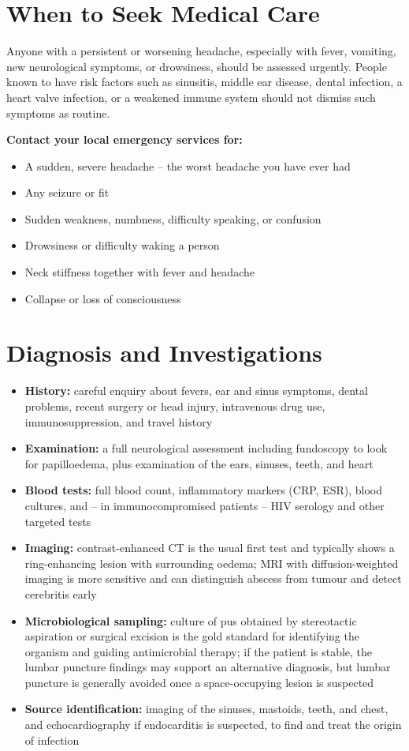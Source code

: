 \section*{When to Seek Medical Care}
Anyone with a persistent or worsening headache, especially with fever, vomiting, new neurological symptoms, or drowsiness, should be assessed urgently. People known to have risk factors such as sinusitis, middle ear disease, dental infection, a heart valve infection, or a weakened immune system should not dismiss such symptoms as routine.

\textbf{Contact your local emergency services for:}
\begin{itemize}
    \item A sudden, severe headache -- the worst headache you have ever had
    \item Any seizure or fit
    \item Sudden weakness, numbness, difficulty speaking, or confusion
    \item Drowsiness or difficulty waking a person
    \item Neck stiffness together with fever and headache
    \item Collapse or loss of consciousness
\end{itemize}

\section*{Diagnosis and Investigations}
\begin{itemize}
    \item \textbf{History:} careful enquiry about fevers, ear and sinus symptoms, dental problems, recent surgery or head injury, intravenous drug use, immunosuppression, and travel history
    \item \textbf{Examination:} a full neurological assessment including fundoscopy to look for papilloedema, plus examination of the ears, sinuses, teeth, and heart
    \item \textbf{Blood tests:} full blood count, inflammatory markers (CRP, ESR), blood cultures, and -- in immunocompromised patients -- HIV serology and other targeted tests
    \item \textbf{Imaging:} contrast-enhanced CT is the usual first test and typically shows a ring-enhancing lesion with surrounding oedema; MRI with diffusion-weighted imaging is more sensitive and can distinguish abscess from tumour and detect cerebritis early
    \item \textbf{Microbiological sampling:} culture of pus obtained by stereotactic aspiration or surgical excision is the gold standard for identifying the organism and guiding antimicrobial therapy; if the patient is stable, the lumbar puncture findings may support an alternative diagnosis, but lumbar puncture is generally avoided once a space-occupying lesion is suspected
    \item \textbf{Source identification:} imaging of the sinuses, mastoids, teeth, and chest, and echocardiography if endocarditis is suspected, to find and treat the origin of infection
\end{itemize}

